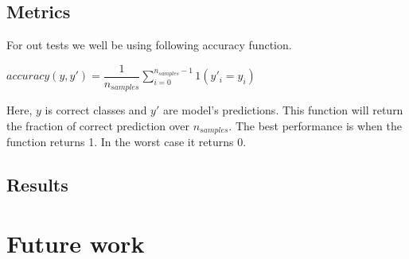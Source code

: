 \documentclass[conference,compsoc]{IEEEtran}
\begin{document}
\subsection{Metrics}

For out tests we well be using following accuracy function. 

$ accuracy(y,y') = \dfrac{1}{n_{samples}}\sum_{i=0}^{n_{samples}-1} 1(y'_{i} =y_{i}) $

Here, $y$ is correct classes and $y'$ are model's predictions. This function will return the fraction of correct prediction over $n_{samples}$. The best performance is when the function returns 1. In the worst case it returns 0.

\subsection{Results}

\section{Future work}
\end{document}
